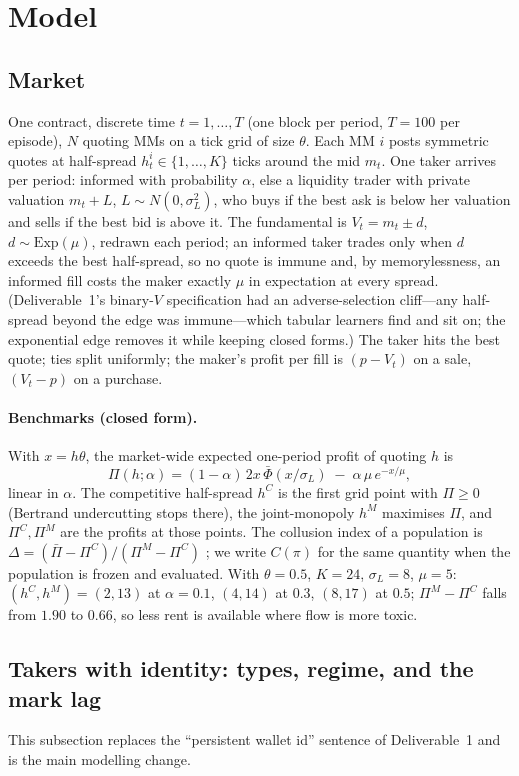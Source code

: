 \documentclass[11pt]{article}
\begin{document}
\section{Model}\label{sec:model}

\subsection{Market}
One contract, discrete time $t=1,\dots,T$ (one block per period, $T=100$ per episode), $N$ quoting MMs on a tick grid of size $\theta$. Each MM $i$ posts symmetric quotes at half-spread $h^i_t\in\{1,\dots,K\}$ ticks around the mid $m_t$. One taker arrives per period: informed with probability $\alpha$, else a liquidity trader with private valuation $m_t+L$, $L\sim N(0,\sigma_L^2)$, who buys if the best ask is below her valuation and sells if the best bid is above it. The fundamental is $V_t = m_t \pm d$, $d\sim\mathrm{Exp}(\mu)$, redrawn each period; an informed taker trades only when $d$ exceeds the best half-spread, so no quote is immune and, by memorylessness, an informed fill costs the maker exactly $\mu$ in expectation at every spread. (Deliverable~1's binary-$V$ specification had an adverse-selection cliff---any half-spread beyond the edge was immune---which tabular learners find and sit on; the exponential edge removes it while keeping closed forms.) The taker hits the best quote; ties split uniformly; the maker's profit per fill is $(p-V_t)$ on a sale, $(V_t-p)$ on a purchase.

\paragraph{Benchmarks (closed form).} With $x=h\theta$, the market-wide expected one-period profit of quoting $h$ is
\[
\Pi(h;\alpha)=(1-\alpha)\,2x\,\bar\Phi(x/\sigma_L)\;-\;\alpha\,\mu\,e^{-x/\mu},
\]
linear in $\alpha$. The competitive half-spread $h^C$ is the first grid point with $\Pi\ge0$ (Bertrand undercutting stops there), the joint-monopoly $h^M$ maximises $\Pi$, and $\Pi^C,\Pi^M$ are the profits at those points. The collusion index of a population is $\Delta=(\bar\Pi-\Pi^C)/(\Pi^M-\Pi^C)$ \cite{calvano}; we write $C(\pi)$ for the same quantity when the population is frozen and evaluated. With $\theta=0.5$, $K=24$, $\sigma_L=8$, $\mu=5$: $(h^C,h^M)=(2,13)$ at $\alpha=0.1$, $(4,14)$ at $0.3$, $(8,17)$ at $0.5$; $\Pi^M-\Pi^C$ falls from $1.90$ to $0.66$, so less rent is available where flow is more toxic.

\subsection{Takers with identity: types, regime, and the mark lag}\label{sec:takers}
This subsection replaces the ``persistent wallet id'' sentence of Deliverable~1 and is the main modelling change.
\end{document}
